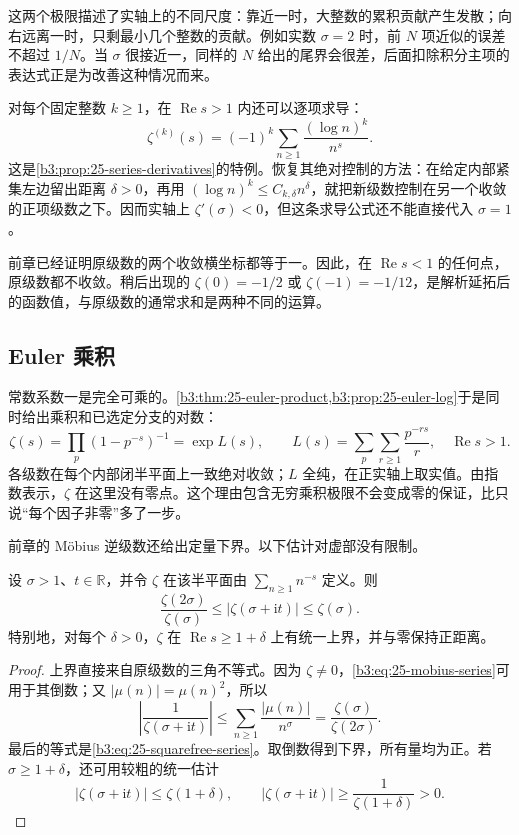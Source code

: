 这两个极限描述了实轴上的不同尺度：靠近一时，大整数的累积贡献产生发散；向右远离一时，只剩最小几个整数的贡献。例如实数 \(\sigma=2\) 时，前 \(N\) 项近似的误差不超过 \(1/N\)。当 \(\sigma\) 很接近一，同样的 \(N\) 给出的尾界会很差，后面扣除积分主项的表达式正是为改善这种情况而来。

对每个固定整数 \(k\ge1\)，在 \(\operatorname{Re}s>1\) 内还可以逐项求导：
\begin{equation}\label{b3:eq:26-zeta-derivatives}
 \zeta^{(k)}(s)=(-1)^k\sum_{n\ge1}\frac{(\log n)^k}{n^s}.
\end{equation}
这是\cref{b3:prop:25-series-derivatives}的特例。恢复其绝对控制的方法：在给定内部紧集左边留出距离 \(\delta>0\)，再用 \((\log n)^k\le C_{k,\delta}n^\delta\)，就把新级数控制在另一个收敛的正项级数之下。因而实轴上 \(\zeta'(\sigma)<0\)，但这条求导公式还不能直接代入 \(\sigma=1\)。

前章已经证明原级数的两个收敛横坐标都等于一。因此，在 \(\operatorname{Re}s<1\) 的任何点，原级数都不收敛。稍后出现的 \(\zeta(0)=-1/2\) 或 \(\zeta(-1)=-1/12\)，是解析延拓后的函数值，与原级数的通常求和是两种不同的运算。

\subsection{Euler 乘积}
\label{b3:subsec:260102}

常数系数一是完全可乘的。\cref{b3:thm:25-euler-product,b3:prop:25-euler-log}于是同时给出乘积和已选定分支的对数：
\begin{equation}\label{b3:eq:26-euler-log}
 \zeta(s)=\prod_p(1-p^{-s})^{-1}
 =\exp L(s),\qquad
 L(s)=\sum_p\sum_{r\ge1}\frac{p^{-rs}}r,
 \quad\operatorname{Re}s>1.
\end{equation}
各级数在每个内部闭半平面上一致绝对收敛；\(L\) 全纯，在正实轴上取实值。由指数表示，\(\zeta\) 在这里没有零点。这个理由包含无穷乘积极限不会变成零的保证，比只说“每个因子非零”多了一步。

前章的 Möbius 逆级数还给出定量下界。以下估计对虚部没有限制。

\begin{proposition}[绝对收敛半平面中的上下界]\label{b3:prop:26-halfplane-bounds}
设 \(\sigma>1\)、\(t\in\mathbb R\)，并令 \(\zeta\) 在该半平面由 \(\sum_{n\ge1}n^{-s}\) 定义。则
\[
 \frac{\zeta(2\sigma)}{\zeta(\sigma)}
 \le|\zeta(\sigma+\mathrm it)|
 \le\zeta(\sigma).
\]
特别地，对每个 \(\delta>0\)，\(\zeta\) 在 \(\operatorname{Re}s\ge1+\delta\) 上有统一上界，并与零保持正距离。
\end{proposition}
\begin{proof}
上界直接来自原级数的三角不等式。因为 \(\zeta\ne0\)，\eqref{b3:eq:25-mobius-series}可用于其倒数；又 \(|\mu(n)|=\mu(n)^2\)，所以
\[
 \left|\frac1{\zeta(\sigma+\mathrm it)}\right|
 \le\sum_{n\ge1}\frac{|\mu(n)|}{n^\sigma}
 =\frac{\zeta(\sigma)}{\zeta(2\sigma)}.
\]
最后的等式是\eqref{b3:eq:25-squarefree-series}。取倒数得到下界，所有量均为正。若 \(\sigma\ge1+\delta\)，还可用较粗的统一估计
\[
 |\zeta(\sigma+\mathrm it)|\le\zeta(1+\delta),
 \qquad
 |\zeta(\sigma+\mathrm it)|\ge\frac1{\zeta(1+\delta)}>0.
\]
\end{proof}

